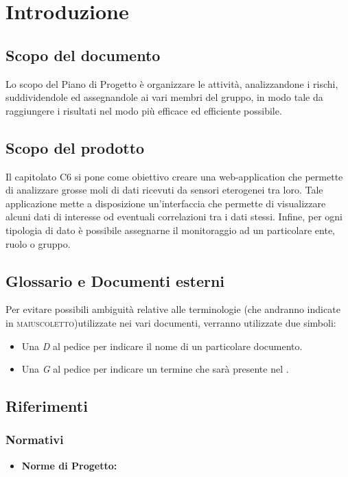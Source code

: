 \section{Introduzione}

	\subsection{Scopo del documento}
		Lo scopo del Piano di Progetto è organizzare le attività, analizzandone i rischi, suddividendole ed assegnandole ai vari membri del gruppo, in modo tale da raggiungere i risultati nel modo più efficace ed efficiente possibile. 
	\subsection{Scopo del prodotto}
		Il capitolato C6 si pone come obiettivo creare una web-application che permette di analizzare grosse moli di dati ricevuti da sensori eterogenei tra loro. Tale applicazione mette a disposizione un'interfaccia che permette di visualizzare alcuni dati di interesse od eventuali correlazioni tra i dati stessi. Infine, per ogni tipologia di dato è possibile assegnarne il monitoraggio ad un particolare ente, ruolo o gruppo.
	\subsection{Glossario e Documenti esterni}
		Per evitare possibili ambiguità relative alle terminologie (che andranno indicate in \textsc{maiuscoletto})utilizzate nei vari documenti, verranno utilizzate due simboli:
		\begin{itemize}
			\item Una \textit{D} al pedice per indicare il nome di un particolare documento.
			\item Una \textit{G} al pedice per indicare un termine che sarà presente nel .
		\end{itemize}
	\subsection{Riferimenti}
		\subsubsection{Normativi}
		\begin{itemize}
			\item \textbf{Norme di Progetto: } 
		\end{itemize}
			
